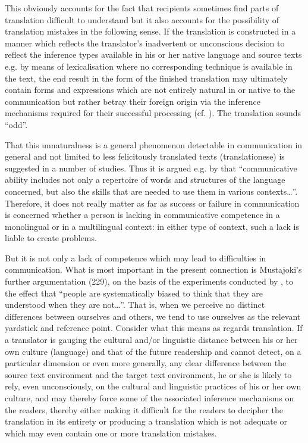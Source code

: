 \documentclass[output=paper]{LSP/langsci}
\begin{document}
  
  This obviously accounts for the fact that recipients sometimes find parts of translation difficult to understand but it also accounts for the possibility of translation mistakes in the following sense. If the translation is constructed in a manner which reflects the translator's inadvertent or unconscious decision to reflect the inference types available in his or her native language and source texts e.g. by means of lexicalisation where no corresponding technique is available in the  text, the end result in the form of the finished translation may ultimately contain forms and expressions which are not entirely natural in or native to the  communication but rather betray their foreign origin via the inference mechanisms required for their successful processing (cf. \citealt[773]{Weigand1999}). The translation sounds ``odd''.

 \largerpage
  That this unnaturalness is a general phenomenon detectable in communication in general and not limited to less felicitously translated texts (translationese) is suggested in a number of studies. Thus it is argued e.g. by \citet[223]{Mustajoki2012} that ``communicative ability includes not only a repertoire of words and structures of the language concerned, but also the skills that are needed to use them in various contexts\ldots''. Therefore, it does not really matter as far as success or failure in communication is concerned whether a person is lacking in communicative competence in a monolingual or in a multilingual context: in either type of context, such a lack is liable to create problems.

  
  But it is not only a lack of competence which may lead to difficulties in communication. What is most important in the present connection is Mustajoki's further argumentation (229), on the basis of the experiments conducted by \citet{Keyzar2002}, to the effect that ``people are systematically biased to think that they are understood when they are not\ldots''. That is, when we perceive no distinct differences between ourselves and others, we tend to use ourselves as the relevant yardstick and reference point. Consider what this means as regards translation. If a translator is gauging the cultural and/or linguistic distance between his or her own culture (language) and that of the future readership and cannot detect, on a particular dimension or even more generally, any clear difference between the source text environment and the target text environment, he or she is likely to rely, even unconsciously, on the cultural and linguistic practices of his or her own culture, and may thereby force some of the associated inference mechanisms on the readers, thereby either making it difficult for the readers to decipher the translation in its entirety or producing a translation which is not adequate or which may even contain one or more translation mistakes.
\end{document}
